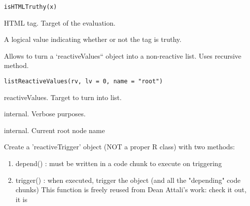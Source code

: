 \documentclass[letterpaper]{book}
\begin{document}
%
\begin{Usage}
\begin{verbatim}
isHTMLTruthy(x)
\end{verbatim}
\end{Usage}
%
\begin{Arguments}
\begin{ldescription}
\item[\code{x}] HTML tag. Target of the evaluation.
\end{ldescription}
\end{Arguments}
%
\begin{Value}
A logical value indicating whether or not the tag is truthy.
\end{Value}
%
\begin{Description}\relax
Allows to turn a `reactiveValues`` object into a non-reactive list. Uses
recursive method.
\end{Description}
%
\begin{Usage}
\begin{verbatim}
listReactiveValues(rv, lv = 0, name = "root")
\end{verbatim}
\end{Usage}
%
\begin{Arguments}
\begin{ldescription}
\item[\code{rv}] reactiveValues. Target to turn into list.

\item[\code{lv}] internal. Verbose purposes.

\item[\code{name}] internal. Current root node name
\end{ldescription}
\end{Arguments}
%
\begin{Description}\relax
Create a 'reactiveTrigger' object (NOT a proper R class) with two methods:
\begin{enumerate}

\item{} depend() : must be written in a code chunk to execute on triggering
\item{} trigger() : when executed, trigger the object (and all the "depending" code chunks)
This function is freely reused from Dean Attali's work: check it out, it is

\end{enumerate}

\end{Description}
\end{document}
